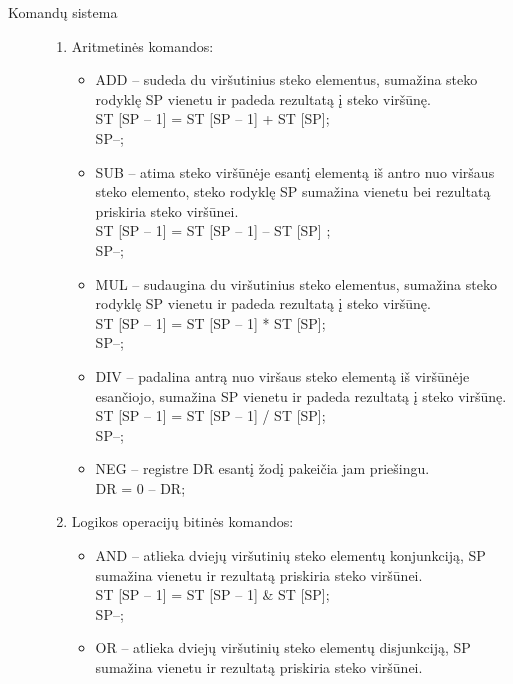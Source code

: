 \begin{description}
\begin{enumerate}
\end{enumerate}  
\item[Komandų sistema] \leavevmode 
\begin{enumerate}
\item Aritmetinės komandos: \leavevmode 
\begin{itemize}
\item ADD – sudeda du viršutinius steko elementus, sumažina steko rodyklę SP vienetu ir padeda rezultatą į steko viršūnę.\leavevmode 
\\ST [SP – 1] = ST [SP – 1] + ST [SP]; \\SP--;\\
\item SUB – atima steko viršūnėje esantį elementą iš antro nuo viršaus steko elemento, steko rodyklę SP sumažina vienetu bei rezultatą priskiria steko viršūnei.\leavevmode
\\ST [SP – 1] = ST [SP – 1] – ST [SP] ; \\SP--;\\
\item MUL – sudaugina du viršutinius steko elementus, sumažina steko rodyklę SP vienetu ir padeda rezultatą į steko viršūnę.\leavevmode
\\ST [SP – 1] = ST [SP – 1] * ST [SP]; \\SP--;\\
\item DIV – padalina antrą nuo viršaus steko elementą iš viršūnėje esančiojo, sumažina SP vienetu ir padeda rezultatą į steko viršūnę.\leavevmode
\\ST [SP – 1] = ST [SP – 1] / ST [SP]; \\SP--;\\
\item NEG – registre DR esantį žodį pakeičia jam priešingu.\leavevmode
\\DR = 0 – DR;\\
\end{itemize}
\item Logikos operacijų bitinės komandos:
\begin{itemize}
\item AND – atlieka dviejų viršutinių steko elementų konjunkciją, SP sumažina vienetu ir rezultatą priskiria steko viršūnei. \leavevmode
\\ST [SP – 1] = ST [SP – 1]  \& ST [SP];\\ SP--;\\
\item OR – atlieka dviejų viršutinių steko elementų disjunkciją, SP sumažina vienetu ir rezultatą priskiria steko viršūnei. \leavevmode

\end{itemize}
\end{enumerate}
\end{description}
